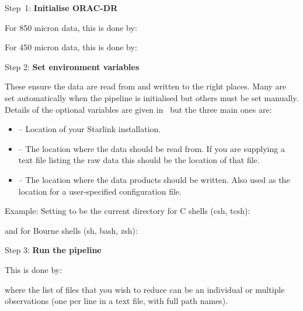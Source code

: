 \begin{aligndesc}
\item[Step~1:]
\textbf{Initialise ORAC-DR}

For 850 micron data, this is done by:
\begin{terminalv}
\end{terminalv}

\vspace{0.2cm}

For 450 micron data, this is done by:

\begin{terminalv}
\end{terminalv}

\vspace{0.2cm}

\item[Step 2:]
\textbf{Set environment variables}

These ensure the data are read from and written to the right
places. Many are set automatically when the pipeline is initialised
but others must be set manually. Details of the optional variables are
given in \pipelinesun\ but the three main ones are:

\begin{itemize}\itemsep-0.1em
\item {} -- Location of your Starlink installation.
\item {} -- The location where the data should be read from.
If you are supplying a text file listing the raw data this should be the
location of that file.
\item {} -- The location where the data products should be
written. Also used as the location for a user-specified configuration file.
\end{itemize}

Example: Setting  to be the current
directory for C shells (csh, tcsh):

\begin{terminalv}
\end{terminalv}

\newpage 

and for Bourne shells (sh, bash, zsh):

\begin{terminalv}
\end{terminalv}


\item[Step 3:]
\textbf{Run the pipeline}

This is done by:
\begin{terminalv}
\end{terminalv}

\vspace{0.2cm}

where the list of files that you wish to reduce can be
an individual or multiple observations (one per line in a text file, 
with full path names).

\end{aligndesc}



